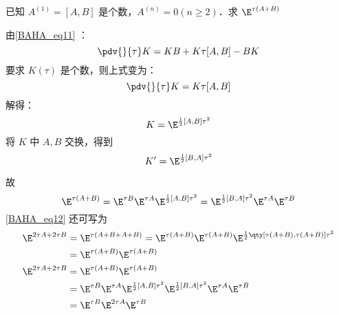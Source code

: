 \begin{example}{}
已知 $A^{(1)}=[A,B]$ 是个数，$A^{(n)}=0(n\geq 2)$．求 $\E^{\tau(A+B)}$

由\autoref{BAHA_eq11} ：
\begin{equation}
\pdv{}{\tau}K=KB+K\tau[A,B]-BK
\end{equation}
要求 $K(\tau)$ 是个数，则上式变为：
\begin{equation}
\pdv{}{\tau}K=K\tau[A,B]
\end{equation}
解得：
\begin{equation}
K=\E^{\frac{1}{2}[A,B]\tau^2}
\end{equation}
将 $K$ 中 $A,B$ 交换，得到 
\begin{equation}
K'=\E^{\frac{1}{2}[B,A]\tau^2}
\end{equation}

故
\begin{equation}\label{BAHA_eq12}
\E^{\tau(A+B)}=\E^{\tau B}\E^{\tau A}\E^{\frac{1}{2}[A,B]\tau^2}=\E^{\frac{1}{2}[B,A]\tau^2}\E^{\tau A}\E^{\tau B}
\end{equation}
\autoref{BAHA_eq12} 还可写为
\begin{equation}
\begin{aligned}
\E^{2\tau A+2\tau B}&=\E^{\tau(A+B+A+B)}=\E^{\tau (A+B)}\E^{\tau (A+B)}\E^{\frac{1}{2}\qty[\tau(A+B),\tau(A+B)]\tau^2}\\
&=\E^{\tau(A+B)}\E^{\tau(A+B)}\\
\E^{2\tau A+2\tau B}&=\E^{\tau(A+B)}\E^{\tau(A+B)}\\
&=\E^{\tau B}\E^{\tau A}\E^{\frac{1}{2}[A,B]\tau^2}\E^{\frac{1}{2}[B,A]\tau^2}\E^{\tau A}\E^{\tau B}\\
&=\E^{\tau B}\E^{2\tau A}\E^{\tau B}
\end{aligned}
\end{equation}
\end{example}
